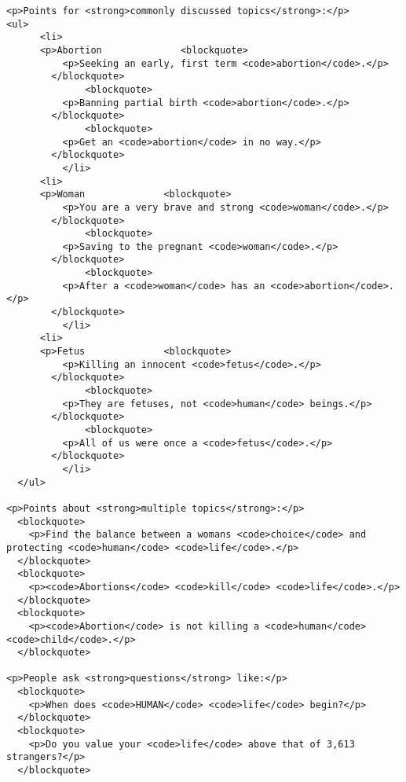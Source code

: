 \documentclass{article}
\begin{document}
\begin{verbatim}
<p>Points for <strong>commonly discussed topics</strong>:</p>
<ul>
      <li>
      <p>Abortion              <blockquote>
          <p>Seeking an early, first term <code>abortion</code>.</p>
        </blockquote>
              <blockquote>
          <p>Banning partial birth <code>abortion</code>.</p>
        </blockquote>
              <blockquote>
          <p>Get an <code>abortion</code> in no way.</p>
        </blockquote>
          </li>
      <li>
      <p>Woman              <blockquote>
          <p>You are a very brave and strong <code>woman</code>.</p>
        </blockquote>
              <blockquote>
          <p>Saving to the pregnant <code>woman</code>.</p>
        </blockquote>
              <blockquote>
          <p>After a <code>woman</code> has an <code>abortion</code>.</p>
        </blockquote>
          </li>
      <li>
      <p>Fetus              <blockquote>
          <p>Killing an innocent <code>fetus</code>.</p>
        </blockquote>
              <blockquote>
          <p>They are fetuses, not <code>human</code> beings.</p>
        </blockquote>
              <blockquote>
          <p>All of us were once a <code>fetus</code>.</p>
        </blockquote>
          </li>
  </ul>

<p>Points about <strong>multiple topics</strong>:</p>
  <blockquote>
    <p>Find the balance between a womans <code>choice</code> and protecting <code>human</code> <code>life</code>.</p>
  </blockquote>
  <blockquote>
    <p><code>Abortions</code> <code>kill</code> <code>life</code>.</p>
  </blockquote>
  <blockquote>
    <p><code>Abortion</code> is not killing a <code>human</code> <code>child</code>.</p>
  </blockquote>

<p>People ask <strong>questions</strong> like:</p>
  <blockquote>
    <p>When does <code>HUMAN</code> <code>life</code> begin?</p>
  </blockquote>
  <blockquote>
    <p>Do you value your <code>life</code> above that of 3,613 strangers?</p>
  </blockquote>


\end{verbatim}
\pagebreak
\end{document}

